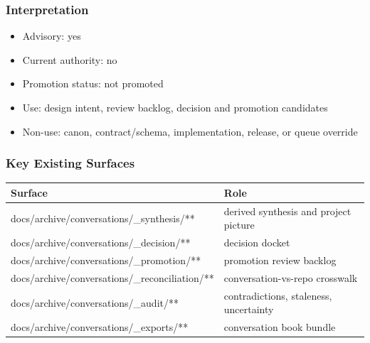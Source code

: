 \documentclass[9pt,a4paper,openany]{book}
\newcommand{\toprule}{\hline}
\newcommand{\midrule}{\hline}
\newcommand{\bottomrule}{\hline}
\begin{document}
\subsubsection{Interpretation}

\begin{itemize}
\item Advisory: yes
\item Current authority: no
\item Promotion status: not promoted
\item Use: design intent, review backlog, decision and promotion candidates
\item Non-\allowbreak{}use: canon, contract/\allowbreak{}schema, implementation, release, or queue override
\end{itemize}

\subsubsection{Key Existing Surfaces}

\begin{center}
{\small\renewcommand{\arraystretch}{1.18}
\begin{tabularx}{\linewidth}{@{}>{\raggedright\arraybackslash}X >{\raggedright\arraybackslash}X@{}}
\toprule
\textbf{Surface} & \textbf{Role} \\
\midrule
docs/\allowbreak{}archive/\allowbreak{}conversations/\allowbreak{}\_\allowbreak{}synthesis/\allowbreak{}** & derived synthesis and project picture \\
docs/\allowbreak{}archive/\allowbreak{}conversations/\allowbreak{}\_\allowbreak{}decision/\allowbreak{}** & decision docket \\
docs/\allowbreak{}archive/\allowbreak{}conversations/\allowbreak{}\_\allowbreak{}promotion/\allowbreak{}** & promotion review backlog \\
docs/\allowbreak{}archive/\allowbreak{}conversations/\allowbreak{}\_\allowbreak{}reconciliation/\allowbreak{}** & conversation-\allowbreak{}vs-\allowbreak{}repo crosswalk \\
docs/\allowbreak{}archive/\allowbreak{}conversations/\allowbreak{}\_\allowbreak{}audit/\allowbreak{}** & contradictions, staleness, uncertainty \\
docs/\allowbreak{}archive/\allowbreak{}conversations/\allowbreak{}\_\allowbreak{}exports/\allowbreak{}** & conversation book bundle \\
\bottomrule
\end{tabularx}
}
\end{center}
\end{document}
